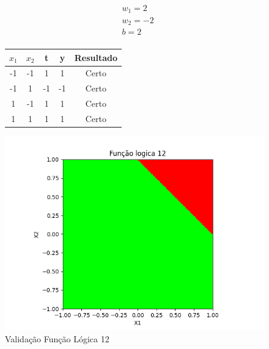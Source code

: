 \begin{figure}[h!]
\centering
\begin{minipage}[c]{0.49\linewidth}
\centering
\[
\begin{aligned}
&w_1 = 2\\
&w_2 = -2\\
&b = 2\\
\end{aligned}
\]
\begin{tabular}{|c|c|c|c|c|}\hline
$x_1$ & $x_2$ & t & y & Resultado\\ \hline
 -1 & -1 & 1 & 1 & Certo\\ \hline
 -1 & 1 & -1 & -1 & Certo\\ \hline
 1 & -1 & 1 & 1 & Certo\\ \hline
 1 & 1 & 1 & 1 & Certo\\ \hline
\end{tabular}
\end{minipage}
\hfill
\begin{minipage}[c]{0.5\linewidth}
\centering
\singlespacing
\includegraphics[width=1.2\textwidth]{im/im12}
\end{minipage}
\caption{Validação Função Lógica 12}
\label{vl12}
\end{figure}

